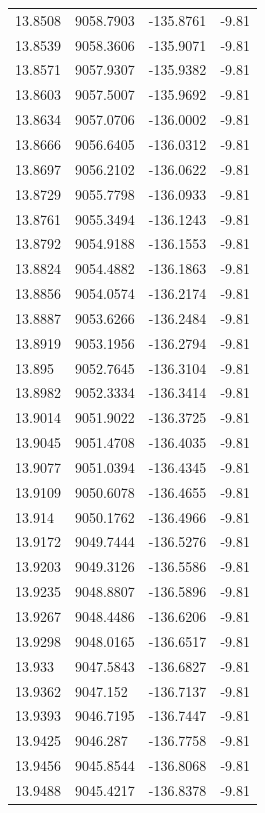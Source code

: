 \begin{table}[H]
\begin{tabular}{llll}
13.8508 & 9058.7903 & -135.8761 & -9.81 \\
13.8539 & 9058.3606 & -135.9071 & -9.81 \\
13.8571 & 9057.9307 & -135.9382 & -9.81 \\
13.8603 & 9057.5007 & -135.9692 & -9.81 \\
13.8634 & 9057.0706 & -136.0002 & -9.81 \\
13.8666 & 9056.6405 & -136.0312 & -9.81 \\
13.8697 & 9056.2102 & -136.0622 & -9.81 \\
13.8729 & 9055.7798 & -136.0933 & -9.81 \\
13.8761 & 9055.3494 & -136.1243 & -9.81 \\
13.8792 & 9054.9188 & -136.1553 & -9.81 \\
13.8824 & 9054.4882 & -136.1863 & -9.81 \\
13.8856 & 9054.0574 & -136.2174 & -9.81 \\
13.8887 & 9053.6266 & -136.2484 & -9.81 \\
13.8919 & 9053.1956 & -136.2794 & -9.81 \\
13.895 & 9052.7645 & -136.3104 & -9.81 \\
13.8982 & 9052.3334 & -136.3414 & -9.81 \\
13.9014 & 9051.9022 & -136.3725 & -9.81 \\
13.9045 & 9051.4708 & -136.4035 & -9.81 \\
13.9077 & 9051.0394 & -136.4345 & -9.81 \\
13.9109 & 9050.6078 & -136.4655 & -9.81 \\
13.914 & 9050.1762 & -136.4966 & -9.81 \\
13.9172 & 9049.7444 & -136.5276 & -9.81 \\
13.9203 & 9049.3126 & -136.5586 & -9.81 \\
13.9235 & 9048.8807 & -136.5896 & -9.81 \\
13.9267 & 9048.4486 & -136.6206 & -9.81 \\
13.9298 & 9048.0165 & -136.6517 & -9.81 \\
13.933 & 9047.5843 & -136.6827 & -9.81 \\
13.9362 & 9047.152 & -136.7137 & -9.81 \\
13.9393 & 9046.7195 & -136.7447 & -9.81 \\
13.9425 & 9046.287 & -136.7758 & -9.81 \\
13.9456 & 9045.8544 & -136.8068 & -9.81 \\
13.9488 & 9045.4217 & -136.8378 & -9.81 \\

\end{tabular}
\end{table}
